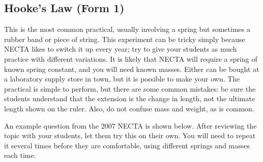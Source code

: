 \subsection{Hooke’s Law (Form 1)}

This is the most common practical, usually involving a spring but sometimes a
rubber band or piece of string. This experiment can be tricky simply because NECTA
likes to switch it up every year; try to give your students as much practice with different
variations. It is likely that NECTA will require a spring of known spring constant, and
you will need known masses. Either can be bought at a laboratory supply store in town,
but it is possible to make your own. The practical is simple to perform, but there are
some common mistakes: be sure the students understand that the extension is the change
in length, not the ultimate length shown on the ruler. Also, do not confuse mass and
weight, as is common.

An example question from the 2007 NECTA is shown below. After reviewing
the topic with your students, let them try this on their own. You will need to repeat it
several times before they are comfortable, using different springs and masses each time.

